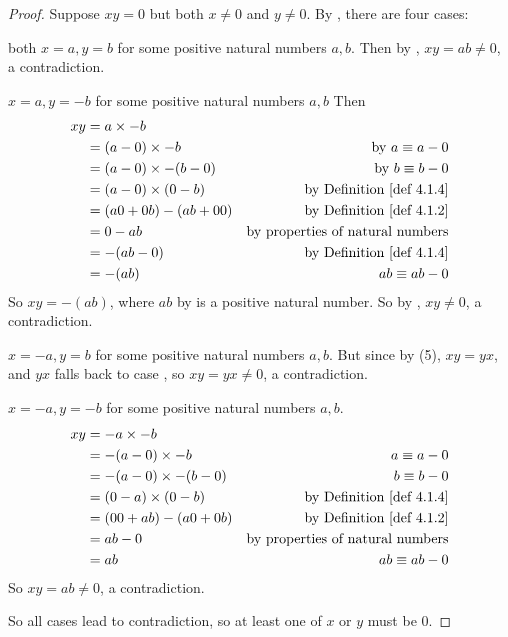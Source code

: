 \begin{proof}
Suppose \(xy = 0\) but both \(x \neq 0\) and \(y \neq 0\).
By , there are four cases:

 both \(x = a,  y = b\) for some positive natural numbers \(a, b\).
Then by , \(xy = ab \neq 0\), a contradiction.

 \(x = a, y = -b\) for some positive natural numbers \(a, b\)
Then
\begin{align*}
    xy & = a \X -b \\
       & = (a - 0) \X -b & \text{by \(a \equiv a - 0\)} \\
       & = (a - 0) \X -(b - 0) & \text{by \(b \equiv b - 0\)} \\
       & = (a - 0) \X (0 - b) & \text{by \DEF{4.1.4}} \\
       & = (a0 + 0b) - (ab + 00) & \text{by \DEF{4.1.2}} \\
       & = 0 - ab & \text{by properties of natural numbers} \\
       & = -(ab - 0) & \text{by \DEF{4.1.4}} \\
       & = -(ab) & \text{\(ab \equiv ab - 0\)}
\end{align*}
So \(xy = -(ab)\), where \(ab\) by  is a positive natural number.
So by , \(xy \neq 0\), a contradiction.

 \(x = -a, y = b\) for some positive natural numbers \(a, b\).
But since by (5), \(xy = yx\), and \(yx\) falls back to case , so \(xy = yx \neq 0\), a contradiction.

 \(x = -a, y = -b\) for some positive natural numbers \(a, b\).
\begin{align*}
    xy & = -a \X -b \\
       & = -(a - 0) \X -b & \text{\(a \equiv a - 0\)} \\
       & = -(a - 0) \X -(b - 0) & \text{\(b \equiv b - 0\)} \\
       & = (0 - a) \X (0 - b) & \text{by \DEF{4.1.4}} \\
       & = (00 + ab) - (a0 + 0b) & \text{by \DEF{4.1.2}} \\
       & = ab - 0 & \text{by properties of natural numbers} \\
       & = ab & \text{\(ab \equiv ab - 0\)}
\end{align*}
So \(xy = ab \neq 0\), a contradiction.

So all cases lead to contradiction, so at least one of \(x\) or \(y\) must be \(0\).
\end{proof}

